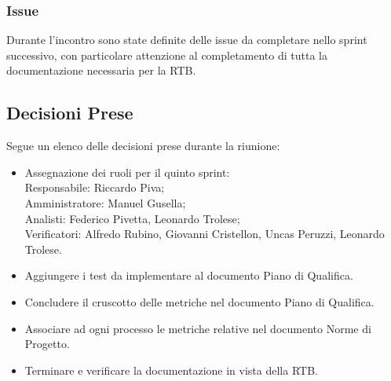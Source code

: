 \documentclass[10pt]{article}
\begin{document}
\subsubsection{Issue}
Durante l'incontro sono state definite delle issue da completare nello sprint successivo, con particolare attenzione al completamento
di tutta la documentazione necessaria per la RTB.

\subsection{Decisioni Prese}
Segue un elenco delle decisioni prese durante la riunione:
\begin{itemize}
    \item   Assegnazione dei ruoli per il quinto sprint:\\
            Responsabile: Riccardo Piva;\\
            Amministratore: Manuel Gusella;\\
            Analisti: Federico Pivetta, Leonardo Trolese;\\
            Verificatori: Alfredo Rubino, Giovanni Cristellon, Uncas Peruzzi, Leonardo Trolese.\\
    \item Aggiungere i test da implementare al documento Piano di Qualifica.
    \item Concludere il cruscotto delle metriche nel documento Piano di Qualifica.
    \item Associare ad ogni processo le metriche relative nel documento Norme di Progetto.
    \item Terminare e verificare la documentazione in vista della RTB.
\end{itemize}
\end{document}

